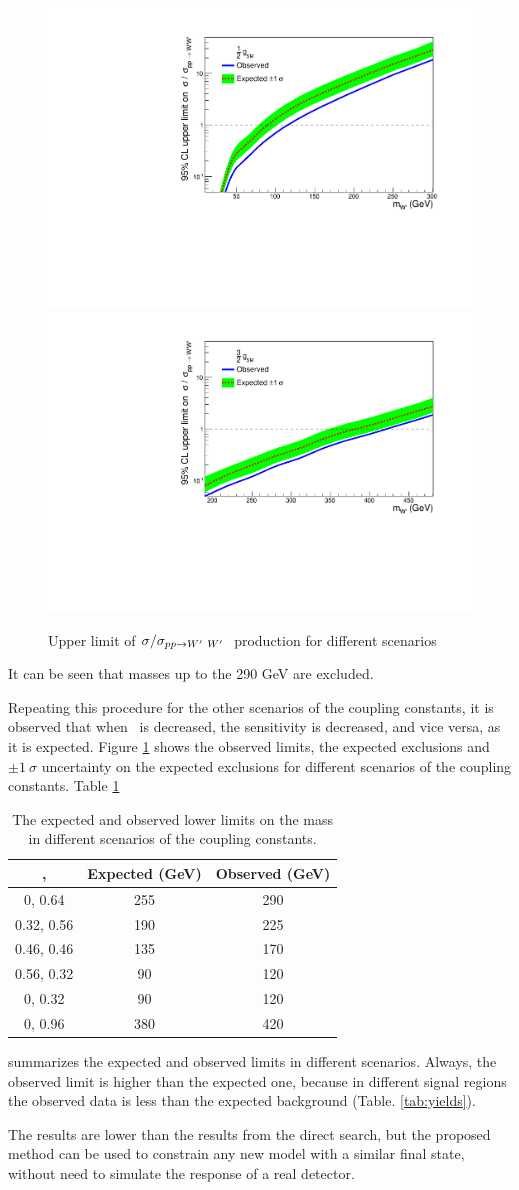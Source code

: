 \begin{figure}[!htb]
  \hspace{3mm}
  \includegraphics*[width=.45\textwidth]{figs/mixHalvedb.pdf}
  \vspace{3mm}
  \includegraphics*[width=.45\textwidth]{figs/mix3Over2b.pdf}
  \caption{Upper limit of $\sigma/\sigma_{pp \rightarrow W^\prime~ W^\prime~}$ production for different scenarios}
  \label{fig:brazilianFlags}
\end{figure}
It can be seen that \wprime masses up to the 290 GeV are excluded.  

Repeating this procedure for the other scenarios of the coupling constants, it is observed that when \gL ~is decreased, the sensitivity is decreased, and vice versa, as it is expected. Figure \ref{fig:brazilianFlags} shows the observed limits, the expected exclusions and $\pm 1 ~\sigma$ uncertainty on the expected exclusions for different scenarios of the coupling constants. Table \ref{tab:ObservedLimits}
\begin{table}[htb]
	\centering
	\caption{The expected and observed lower limits on the \wprime mass in different scenarios of the coupling constants. \label{tab:ObservedLimits} }
	\begin{tabular}{|c|c|c|}
	\hline
	\gR, \gL           & Expected (GeV) & Observed (GeV) \\\hline
    0, 0.64            &   255    &    290  \\
	0.32, 0.56         &   190    &    225  \\
	0.46, 0.46         &   135    &    170  \\
	0.56, 0.32         &   90     &    120  \\
    0, 0.32            &   90     &    120  \\
    0, 0.96            &   380    &    420  \\\hline
	\end{tabular}
\end{table}
summarizes the expected and observed limits in different scenarios. Always, the observed limit is higher than the expected one, because in different signal regions the observed data is less than the expected background (Table. \ref{tab:yields}).

The results are lower than the results from the direct search, but the proposed method can be used to constrain any new model with a similar final state, without need to simulate the response of a real detector.
